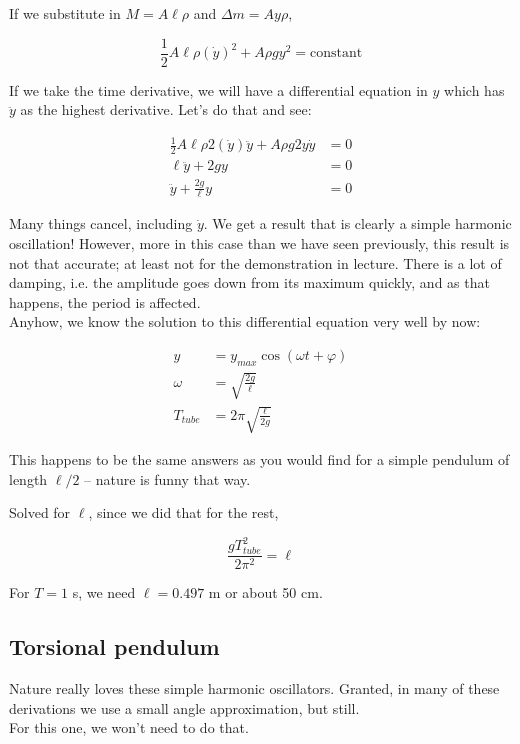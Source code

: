 If we substitute in $M = A \ell \rho$ and $\Delta m = A y \rho$,

\begin{equation}
\frac{1}{2} A \ell \rho (\dot{y})^2 + A \rho g y^2 = \text{constant}
\end{equation}

If we take the time derivative, we will have a differential equation in $y$ which has $\ddot{y}$ as the highest derivative. Let's do that and see:

\begin{align}
\frac{1}{2} A \ell \rho 2 (\dot{y}) \ddot{y} + A \rho g 2 y \dot{y} &= 0\\
\ell \ddot{y} +  2 g y &= 0\\
\ddot{y} +  \frac{2 g}{\ell} y &= 0
\end{align}

Many things cancel, including $\dot{y}$. We get a result that is clearly a simple harmonic oscillation! However, more in this case than we have seen previously, this result is not that accurate; at least not for the demonstration in lecture. There is a lot of damping, i.e. the amplitude goes down from its maximum quickly, and as that happens, the period is affected.\\
Anyhow, we know the solution to this differential equation very well by now:

\begin{align}
y &= y_{max} \cos(\omega t + \varphi)\\
\omega &= \sqrt{\frac{2 g}{\ell}}\\
T_{tube} &= 2 \pi \sqrt{\frac{\ell}{2 g}}
\end{align}

This happens to be the same answers as you would find for a simple pendulum of length $\ell/2$ -- nature is funny that way.

Solved for $\ell$, since we did that for the rest,

\begin{equation}
\frac{g T_{tube}^2}{2 \pi^2} = \ell
\end{equation}

For $T = 1$ s, we need $\ell = 0.497$ m or about 50 cm.

\subsection{Torsional pendulum}

Nature really loves these simple harmonic oscillators. Granted, in many of these derivations we use a small angle approximation, but still.\\
For this one, we won't need to do that.

